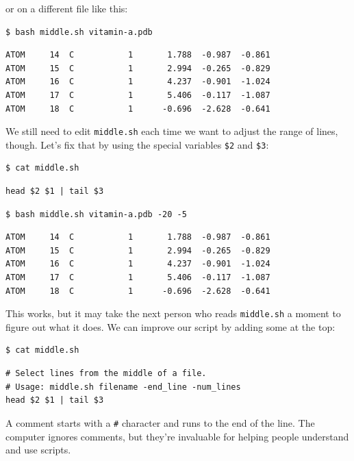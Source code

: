 \documentclass{book}
\begin{document}
or on a different file like this:

\begin{verbatim}
$ bash middle.sh vitamin-a.pdb
\end{verbatim}

\begin{verbatim}
ATOM     14  C           1       1.788  -0.987  -0.861
ATOM     15  C           1       2.994  -0.265  -0.829
ATOM     16  C           1       4.237  -0.901  -1.024
ATOM     17  C           1       5.406  -0.117  -1.087
ATOM     18  C           1      -0.696  -2.628  -0.641
\end{verbatim}

We still need to edit \texttt{middle.sh} each time we want to adjust the
range of lines, though. Let's fix that by using the special variables
\texttt{\$2} and \texttt{\$3}:

\begin{verbatim}
$ cat middle.sh
\end{verbatim}

\begin{verbatim}
head $2 $1 | tail $3
\end{verbatim}

\begin{verbatim}
$ bash middle.sh vitamin-a.pdb -20 -5
\end{verbatim}

\begin{verbatim}
ATOM     14  C           1       1.788  -0.987  -0.861
ATOM     15  C           1       2.994  -0.265  -0.829
ATOM     16  C           1       4.237  -0.901  -1.024
ATOM     17  C           1       5.406  -0.117  -1.087
ATOM     18  C           1      -0.696  -2.628  -0.641
\end{verbatim}

This works, but it may take the next person who reads \texttt{middle.sh}
a moment to figure out what it does. We can improve our script by adding
some  at the top:

\begin{verbatim}
$ cat middle.sh
\end{verbatim}

\begin{verbatim}
# Select lines from the middle of a file.
# Usage: middle.sh filename -end_line -num_lines
head $2 $1 | tail $3
\end{verbatim}

A comment starts with a \texttt{\#} character and runs to the end of the
line. The computer ignores comments, but they're invaluable for helping
people understand and use scripts.
\end{document}
